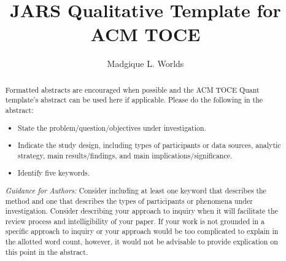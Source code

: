 \documentclass[acmsmall]{acmart}
\begin{document}
\title[JARS Qualitative Template for ACM TOCE]{JARS Qualitative Template for ACM TOCE}

\author{Madgique L. Worlds}

\renewcommand{\shortauthors}{Worlds}

\newcommand{\AbstractCategory}[1]{%
  \par\addvspace{.5\baselineskip}%
  \noindent\textbf{#1}\quad\ignorespaces
}

%
\begin{abstract}

Formatted abstracts are encouraged when possible and the ACM TOCE Quant template's abstract can be used here if applicable. Please do the following in the abstract:

\begin{itemize}
    \item State the problem/question/objectives under investigation.

    \item Indicate the study design, including types of participants or data sources, analytic strategy, main results/findings, and main implications/significance.

    \item Identify five keywords.
\end{itemize}

\textit{Guidance for Authors:} Consider including at least one keyword that describes the method and one that describes the types of participants or phenomena under investigation.  Consider describing your approach to inquiry when it will facilitate the review process and intelligibility of your paper. If your work is not grounded in a specific approach to inquiry or your approach would be too complicated to explain in the allotted word count, however, it would not be advisable to provide explication on this point in the abstract.
\end{abstract}
\end{document}
